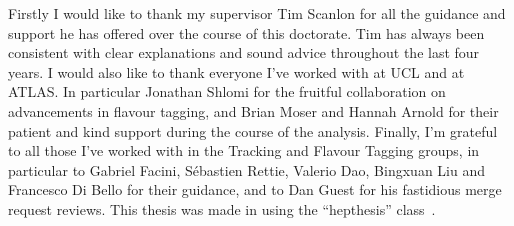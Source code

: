 Firstly I would like to thank my supervisor Tim Scanlon for all the guidance and support he has offered over the course of this doctorate.
Tim has always been consistent with clear explanations and sound advice throughout the last four years.
I would also like to thank everyone I've worked with at UCL and at ATLAS.
In particular Jonathan Shlomi for the fruitful collaboration on advancements in flavour tagging, and Brian Moser and Hannah Arnold for their patient and kind support during the course of the \VHbb analysis.
Finally, I'm grateful to all those I've worked with in the Tracking and Flavour Tagging groups, in particular to Gabriel Facini, S\'ebastien Rettie, Valerio Dao, Bingxuan Liu and Francesco Di Bello for their guidance, and to Dan Guest for his fastidious merge request reviews.
This thesis was made in \LaTeXe{} using the ``hepthesis'' class~\cite{Buckley:2010:hepthesis}.
